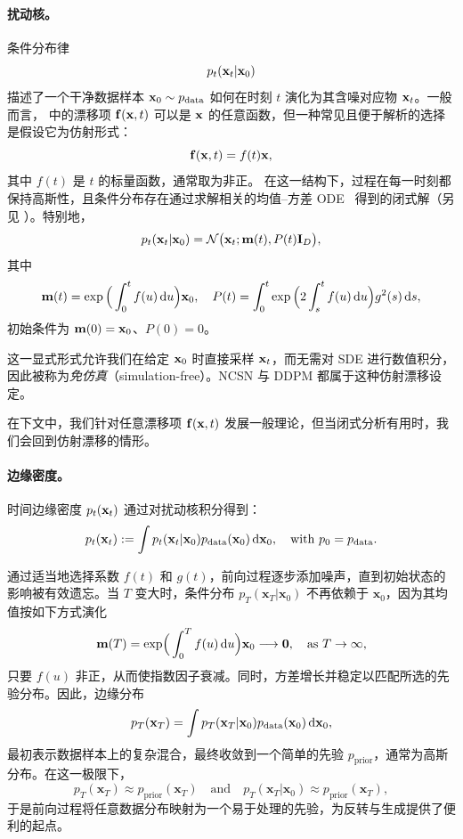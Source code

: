 \paragraph{扰动核。}
条件分布律
\[
p_t({\mathbf{x}}_t |{\mathbf{x}}_0)
\]
描述了一个干净数据样本 $ {\mathbf{x}}_0 \sim p_{\mathrm{data}} $ 如何在时刻 $t$ 演化为其含噪对应物 ${\mathbf{x}}_t$。一般而言， 中的漂移项 ${\mathbf{f}}({\mathbf{x}},t)$ 可以是 ${\mathbf{x}}$ 的任意函数，但一种常见且便于解析的选择是假设它为仿射形式：
\begin{equation}\label{eq:affine-drift}
    {\mathbf{f}}({\mathbf{x}},t) = f(t) {\mathbf{x}}, 
\end{equation}
其中 $f(t)$ 是 $t$ 的标量函数，通常取为非正。
在这一结构下，过程在每一时刻都保持高斯性，且条件分布存在通过求解相关的均值--方差 ODE~\citep{sarkka2019applied} 得到的闭式解（另见 ）。{特别地，
\[
p_t({\mathbf{x}}_t |{\mathbf{x}}_0) = \mathcal{N} \big({\mathbf{x}}_t; {\mathbf{m}}(t), P(t)\mathbf I_D\big),
\]
其中
\[
{\mathbf{m}}(t) = \exp \Big(\int_0^t f(u) \mathop{}\!\mathrm{d} u\Big) {\mathbf{x}}_0,
\quad
P(t) = \int_0^t \exp \Big(2 \int_s^t f(u) \mathop{}\!\mathrm{d} u\Big) g^2(s) \mathop{}\!\mathrm{d} s,
\]
初始条件为 ${\mathbf{m}}(0)={\mathbf{x}}_0$、$P(0)=0$。}

这一显式形式允许我们在给定 ${\mathbf{x}}_0$ 时直接采样 ${\mathbf{x}}_t$，而无需对 SDE 进行数值积分，因此被称为\emph{免仿真}（simulation-free）。NCSN 与 DDPM 都属于这种仿射漂移设定。

在下文中，我们针对任意漂移项 ${\mathbf{f}}({\mathbf{x}},t)$ 发展一般理论，但当闭式分析有用时，我们会回到仿射漂移的情形。



\paragraph{边缘密度。}
时间边缘密度 $ p_t({\mathbf{x}}_t) $ 通过对扰动核积分得到：
\begin{equation}\label{eq:scoresde-oracle-marginal}
    p_t({\mathbf{x}}_t) := \int p_t({\mathbf{x}}_t|{\mathbf{x}}_0) p_{\mathrm{data}}({\mathbf{x}}_0) \mathop{}\!\mathrm{d} {\mathbf{x}}_0, \quad \text{with } p_0 = p_{\mathrm{data}}.
\end{equation}

{通过适当地选择系数 $f(t)$ 和 $g(t)$，前向过程逐步添加噪声，直到初始状态的影响被有效遗忘。当 $T$ 变大时，条件分布 $p_T(\mathbf{x}_T |\mathbf{x}_0)$ 不再依赖于 $\mathbf{x}_0$，因为其均值按如下方式演化
\[
{\mathbf{m}}(T) = \exp\!\Big(\int_0^T f(u)\mathop{}\!\mathrm{d} u\Big) \mathbf{x}_0  \longrightarrow  \mathbf{0}, \quad \text{as } T\to\infty,
\]
只要 $f(u)$ 非正，从而使指数因子衰减。同时，方差增长并稳定以匹配所选的先验分布。}因此，边缘分布
\[
p_T(\mathbf{x}_T) = \int p_T(\mathbf{x}_T |\mathbf{x}_0) p_{\mathrm{data}}(\mathbf{x}_0)\mathop{}\!\mathrm{d}\mathbf{x}_0,
\]
最初表示数据样本上的复杂混合，最终收敛到一个简单的先验 $p_{\mathrm{prior}}$，通常为高斯分布。在这一极限下，
\[
p_T(\mathbf{x}_T) \approx p_{\mathrm{prior}}(\mathbf{x}_T) 
\quad \text{and} \quad 
p_T(\mathbf{x}_T |\mathbf{x}_0) \approx p_{\mathrm{prior}}(\mathbf{x}_T),
\]
于是前向过程将任意数据分布映射为一个易于处理的先验，为反转与生成提供了便利的起点。




